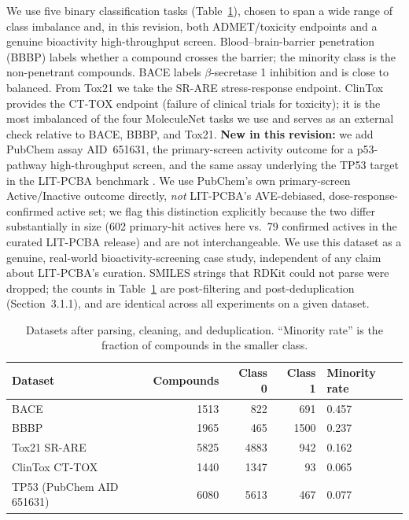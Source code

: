 \documentclass[11pt]{article}
\begin{document}
We use five binary classification tasks (Table~\ref{tab:datasets}), chosen to span a wide range of
class imbalance and, in this revision, both ADMET/toxicity endpoints and a genuine bioactivity
high-throughput screen. Blood--brain-barrier penetration (BBBP) \cite{martins2012} labels whether a
compound crosses the barrier; the minority class is the non-penetrant compounds. BACE
\cite{subramanian2016} labels $\beta$-secretase 1 inhibition and is close to balanced. From Tox21
\cite{huang2016} we take the SR-ARE stress-response endpoint. ClinTox provides the CT-TOX endpoint
(failure of clinical trials for toxicity); it is the most imbalanced of the four MoleculeNet
\cite{wu2018} tasks we use and serves as an external check relative to BACE, BBBP, and Tox21.
\textbf{New in this revision:} we add PubChem assay AID~651631, the primary-screen activity outcome
for a p53-pathway high-throughput screen, and the same assay underlying the TP53 target in the
LIT-PCBA benchmark \cite{tran2020}. We use PubChem's own primary-screen Active/Inactive outcome
directly, \emph{not} LIT-PCBA's AVE-debiased, dose-response-confirmed active set; we flag this
distinction explicitly because the two differ substantially in size (602 primary-hit actives here
vs.\ 79 confirmed actives in the curated LIT-PCBA release) and are not interchangeable. We use this
dataset as a genuine, real-world bioactivity-screening case study, independent of any claim about
LIT-PCBA's curation. SMILES strings that RDKit \cite{rdkit} could not parse were dropped; the
counts in Table~\ref{tab:datasets} are post-filtering and post-deduplication (Section~3.1.1), and
are identical across all experiments on a given dataset.

\begin{table}[h]
\centering
\caption{Datasets after parsing, cleaning, and deduplication. ``Minority rate'' is the fraction of
compounds in the smaller class.}
\label{tab:datasets}
\begin{tabular}{lrrrl}
\toprule
Dataset & Compounds & Class 0 & Class 1 & Minority rate \\
\midrule
BACE & 1513 & 822 & 691 & 0.457 \\
BBBP & 1965 & 465 & 1500 & 0.237 \\
Tox21 SR-ARE & 5825 & 4883 & 942 & 0.162 \\
ClinTox CT-TOX & 1440 & 1347 & 93 & 0.065 \\
TP53 (PubChem AID 651631) & 6080 & 5613 & 467 & 0.077 \\
\bottomrule
\end{tabular}
\end{table}
\end{document}
